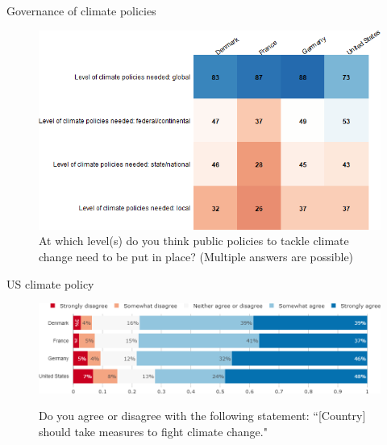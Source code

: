 \documentclass[aspectratio=169,9pt,dvipsnames]{beamer}
\begin{document}
\begin{frame}{Governance of climate policies}%
\vspace{-1cm}
\begin{figure}[h!]
\centering
\caption{\small{At which level(s) do you think public policies to tackle climate change need to be put in place? (Multiple answers are possible)}}
\includegraphics[width=.6\textwidth]{../figures/country_comparison/scale_positive_countries.png}
\end{figure}
\end{frame}

\begin{frame}{US climate policy}%
\begin{figure}[h!]
\centering
\caption{Do you agree or disagree with the following statement: ``[Country] should take measures to fight climate change."}
\includegraphics[width=1\textwidth]{../figures/country_comparison/should_fight_CC_countries.png} \\
\end{figure}
\end{frame}
\end{document}
